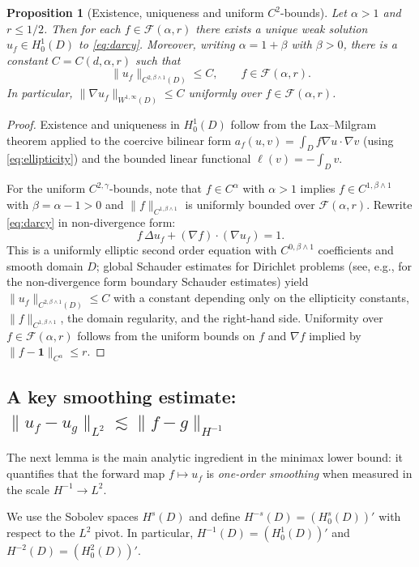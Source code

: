 \documentclass[11pt]{article}
\newtheorem{proposition}{Proposition}
\theoremstyle{definition}
\theoremstyle{remark}
\newcommand{\1}{\mathbf{1}}
\begin{document}
\begin{proposition}[Existence, uniqueness and uniform $C^2$-bounds]\label{prop:wellposed}
Let $\alpha>1$ and $r\le1/2$. Then for each $f\in\mathcal F(\alpha,r)$ there exists a unique weak solution $u_f\in H_0^1(D)$ to \eqref{eq:darcy}.
Moreover, writing $\alpha=1+\beta$ with $\beta>0$, there is a constant $C=C(d,\alpha,r)$ such that
\[
\|u_f\|_{C^{2,\beta\wedge 1}(D)}\le C,\qquad f\in\mathcal F(\alpha,r).
\]
In particular, $\|\nabla u_f\|_{W^{1,\infty}(D)}\le C$ uniformly over $f\in\mathcal F(\alpha,r)$.
\end{proposition}

\begin{proof}
Existence and uniqueness in $H_0^1(D)$ follow from the Lax--Milgram theorem applied to the coercive bilinear form
\(
a_f(u,v)=\int_D f\nabla u\cdot\nabla v
\)
(using \eqref{eq:ellipticity}) and the bounded linear functional $\ell(v)=-\int_D v$.

For the uniform $C^{2,\gamma}$-bounds, note that $f\in C^\alpha$ with $\alpha>1$ implies $f\in C^{1,\beta\wedge 1}$ with $\beta=\alpha-1>0$ and $\|f\|_{C^{1,\beta\wedge 1}}$ is uniformly bounded over $\mathcal F(\alpha,r)$. Rewrite \eqref{eq:darcy} in non-divergence form:
\[
f\,\Delta u_f + (\nabla f)\cdot(\nabla u_f)=1.
\]
This is a uniformly elliptic second order equation with $C^{0,\beta\wedge1}$ coefficients and smooth domain $D$; global Schauder estimates for Dirichlet problems (see, e.g., \cite[Theorems~6.30 and~6.31]{GilbargTrudinger2001} for the non-divergence form boundary Schauder estimates) yield
\(
\|u_f\|_{C^{2,\beta\wedge1}(D)}\le C
\)
with a constant depending only on the ellipticity constants, $\|f\|_{C^{1,\beta\wedge 1}}$, the domain regularity, and the right-hand side.
Uniformity over $f\in\mathcal F(\alpha,r)$ follows from the uniform bounds on $f$ and $\nabla f$ implied by $\|f-\1\|_{C^\alpha}\le r$.
\end{proof}

\subsection{A key smoothing estimate: $\|u_f-u_g\|_{L^2}\lesssim\|f-g\|_{H^{-1}}$}

The next lemma is the main analytic ingredient in the minimax lower bound: it quantifies that the forward map $f\mapsto u_f$ is \emph{one-order smoothing} when measured in the scale $H^{-1}\to L^2$.

We use the Sobolev spaces $H^s(D)$ and define $H^{-s}(D)=(H_0^s(D))'$ with respect to the $L^2$ pivot. In particular, $H^{-1}(D)=(H_0^1(D))'$ and $H^{-2}(D)=(H_0^2(D))'$.
\end{document}
